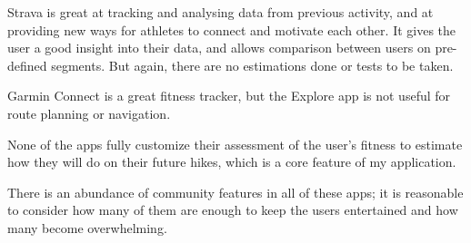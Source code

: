 Strava is great at tracking and analysing data from previous activity, and at providing new ways for athletes to connect and motivate each other.
It gives the user a good insight into their data, and allows comparison between users on pre-defined segments.
But again, there are no estimations done or tests to be taken.

Garmin Connect is a great fitness tracker, but the Explore app is not useful for route planning or navigation.

None of the apps fully customize their assessment of the user's fitness to estimate how they will do on their future hikes, which is a core feature of my application.

There is an abundance of community features in all of these apps; it is reasonable to consider how many of them are enough to keep the users entertained and how many become overwhelming.

